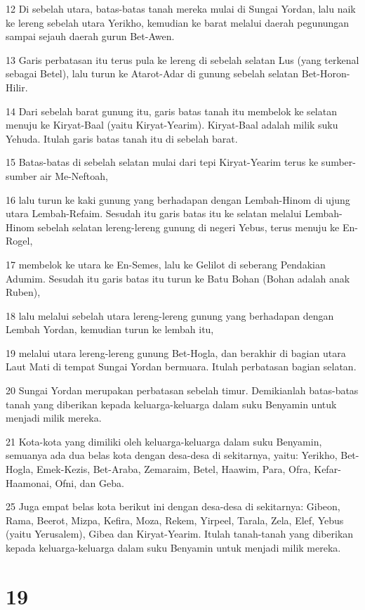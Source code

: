 \par 12 Di sebelah utara, batas-batas tanah mereka mulai di Sungai Yordan, lalu naik ke lereng sebelah utara Yerikho, kemudian ke barat melalui daerah pegunungan sampai sejauh daerah gurun Bet-Awen.
\par 13 Garis perbatasan itu terus pula ke lereng di sebelah selatan Lus (yang terkenal sebagai Betel), lalu turun ke Atarot-Adar di gunung sebelah selatan Bet-Horon-Hilir.
\par 14 Dari sebelah barat gunung itu, garis batas tanah itu membelok ke selatan menuju ke Kiryat-Baal (yaitu Kiryat-Yearim). Kiryat-Baal adalah milik suku Yehuda. Itulah garis batas tanah itu di sebelah barat.
\par 15 Batas-batas di sebelah selatan mulai dari tepi Kiryat-Yearim terus ke sumber-sumber air Me-Neftoah,
\par 16 lalu turun ke kaki gunung yang berhadapan dengan Lembah-Hinom di ujung utara Lembah-Refaim. Sesudah itu garis batas itu ke selatan melalui Lembah-Hinom sebelah selatan lereng-lereng gunung di negeri Yebus, terus menuju ke En-Rogel,
\par 17 membelok ke utara ke En-Semes, lalu ke Gelilot di seberang Pendakian Adumim. Sesudah itu garis batas itu turun ke Batu Bohan (Bohan adalah anak Ruben),
\par 18 lalu melalui sebelah utara lereng-lereng gunung yang berhadapan dengan Lembah Yordan, kemudian turun ke lembah itu,
\par 19 melalui utara lereng-lereng gunung Bet-Hogla, dan berakhir di bagian utara Laut Mati di tempat Sungai Yordan bermuara. Itulah perbatasan bagian selatan.
\par 20 Sungai Yordan merupakan perbatasan sebelah timur. Demikianlah batas-batas tanah yang diberikan kepada keluarga-keluarga dalam suku Benyamin untuk menjadi milik mereka.
\par 21 Kota-kota yang dimiliki oleh keluarga-keluarga dalam suku Benyamin, semuanya ada dua belas kota dengan desa-desa di sekitarnya, yaitu: Yerikho, Bet-Hogla, Emek-Kezis, Bet-Araba, Zemaraim, Betel, Haawim, Para, Ofra, Kefar-Haamonai, Ofni, dan Geba.
\par 25 Juga empat belas kota berikut ini dengan desa-desa di sekitarnya: Gibeon, Rama, Beerot, Mizpa, Kefira, Moza, Rekem, Yirpeel, Tarala, Zela, Elef, Yebus (yaitu Yerusalem), Gibea dan Kiryat-Yearim. Itulah tanah-tanah yang diberikan kepada keluarga-keluarga dalam suku Benyamin untuk menjadi milik mereka.

\chapter{19}

